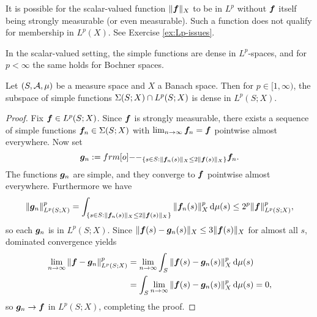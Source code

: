 \begin{rmk}\label{rmk:lp-issues}
  It is possible for the scalar-valued function $\|\bm{f}\|_X$ to be in $L^p$ without $\bm{f}$ itself being strongly measurable (or even measurable).
  Such a function does not qualify for membership in $L^p(X)$.
  See Exercise \ref{ex:Lp-issues}.
\end{rmk}

In the scalar-valued setting, the simple functions are dense in $L^p$-spaces, and for $p < \infty$ the same holds for Bochner spaces. 

\begin{prop}\label{prop:simple-density}
  Let $(S,\mathcal{A},\mu)$ be a measure space and $X$ a Banach space.
  Then for $p \in [1,\infty)$, the subspace of simple functions $\Sigma(S;X) \cap L^p(S;X)$ is dense in $L^p(S;X)$.
\end{prop}

\begin{proof}
  Fix $\bm{f} \in L^p(S;X)$.
  Since $\bm{f}$ is strongly measurable, there exists a sequence of simple functions $\bm{f}_n \in \Sigma(S;X)$ with $\lim_{n \to \infty} \bm{f}_n = \bm{f}$ pointwise almost everywhere.
  Now set
  \begin{equation*}
    \mb{g}_n := \1_{ \{s \in S : \|\mb{f}_n(s)\|_X \leq 2\|\mb{f}(s)\|_X\} } \mb{f}_n.
  \end{equation*}
  The functions $\bm{g}_n$ are simple, and they converge to $\bm{f}$ pointwise almost everywhere.
  Furthermore we have
  \begin{equation*}
    \|\bm{g}_n\|_{L^p(S;X)}^p = \int_{\{s \in S : \|\bm{f}_n(s)\|_X \leq 2\|\bm{f}(s)\|_X \} } \|\bm{f}_n(s)\|_X^p \, \mathrm{d}\mu(s) \leq 2^p \|\bm{f}\|_{L^p(S;X)}^p,
  \end{equation*}
  so each $\bm{g}_n$ is in $L^p(S;X)$.
  Since $\|\bm{f}(s) - \bm{g}_n(s)\|_X \leq 3\|\bm{f}(s)\|_X$ for almost all $s$, dominated convergence yields
  \begin{equation*}
    \begin{aligned}
      \lim_{n \to \infty} \|\bm{f} - \bm{g}_n\|_{L^p(S;X)}^p &= \lim_{n \to \infty} \int_S \|\bm{f}(s) - \bm{g}_n(s)\|_{X}^p \, \mathrm{d}\mu(s) \\
      &= \int_S \lim_{n \to \infty}  \|\bm{f}(s) - \bm{g}_n(s)\|_{X}^p \, \mathrm{d}\mu(s) = 0,
    \end{aligned}
  \end{equation*}
  so $\bm{g}_n \to \bm{f}$ in $L^p(S;X)$, completing the proof.
\end{proof}


